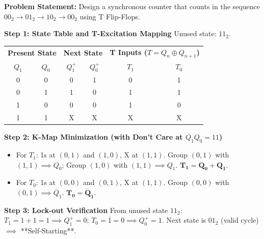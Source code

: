 \begin{example}
\textbf{Problem Statement:} Design a synchronous counter that counts in the sequence $00_2 \rightarrow 01_2 \rightarrow 10_2 \rightarrow 00_2$ using T Flip-Flops.

\tcblower
\textbf{Step 1: State Table and T-Excitation Mapping}
Unused state: $11_2$.

\begin{center}
\small
\begin{tabular}{cc|cc|cc}
\toprule
\multicolumn{2}{c|}{\textbf{Present State}} & \multicolumn{2}{c|}{\textbf{Next State}} & \multicolumn{2}{c}{\textbf{T Inputs ($T = Q_n \oplus Q_{n+1}$)}} \\
$Q_1$ & $Q_0$ & $Q_1^+$ & $Q_0^+$ & $T_1$ & $T_0$ \\
\midrule
0 & 0 & 0 & 1 & 0 & 1 \\
0 & 1 & 1 & 0 & 1 & 1 \\
1 & 0 & 0 & 0 & 1 & 0 \\
1 & 1 & X & X & X & X \\
\bottomrule
\end{tabular}
\end{center}

\textbf{Step 2: K-Map Minimization (with Don't Care at $Q_1Q_0 = 11$)}
\begin{itemize}
    \item For $T_1$: 1s at $(0,1)$ and $(1,0)$, X at $(1,1)$.
    Group $(0,1)$ with $(1,1) \implies Q_0$; Group $(1,0)$ with $(1,1) \implies Q_1$.
    $\mathbf{T_1 = Q_0 + Q_1}$.
    \item For $T_0$: 1s at $(0,0)$ and $(0,1)$, X at $(1,1)$.
    Group $(0,0)$ with $(0,1) \implies \overline{Q}_1$.
    $\mathbf{T_0 = \overline{Q}_1}$.
\end{itemize}

\textbf{Step 3: Lock-out Verification}
From unused state $11_2$: $T_1 = 1+1 = 1 \implies Q_1^+ = 0$; $T_0 = \overline{1} = 0 \implies Q_0^+ = 1$.
Next state is $01_2$ (valid cycle) $\implies$ **Self-Starting**.
\end{example}
